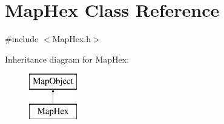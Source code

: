 \hypertarget{class_map_hex}{}\section{Map\+Hex Class Reference}
\label{class_map_hex}


{\ttfamily \#include $<$Map\+Hex.\+h$>$}

Inheritance diagram for Map\+Hex\+:\begin{figure}[H]
\begin{center}
\leavevmode
\includegraphics[height=2.000000cm]{d8/d79/class_map_hex}
\end{center}
\end{figure}
